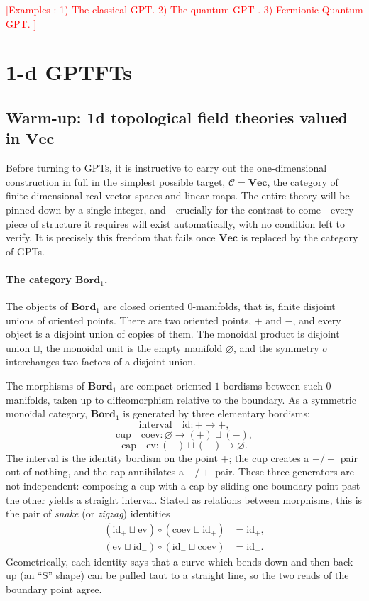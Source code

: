 \documentclass[prl,aps,10pt,superscriptaddress, floatfix]{revtex4-2}
\begin{document}
\textcolor{red}{[Examples : 1) The classical GPT. 2) The quantum GPT . 3) Fermionic Quantum GPT.  ]}

\section{1-d GPTFTs}

\subsection{Warm-up: 1d topological field theories valued in \texorpdfstring{$\mathbf{Vec}$}{Vec}}

Before turning to GPTs, it is instructive to carry out the one-dimensional construction in full in the simplest possible target, $\mathcal C=\mathbf{Vec}$, the category of finite-dimensional real vector spaces and linear maps. The entire theory will be pinned down by a single integer, and---crucially for the contrast to come---every piece of structure it requires will exist automatically, with no condition left to verify. It is precisely this freedom that fails once $\mathbf{Vec}$ is replaced by the category of GPTs.

\paragraph{The category $\mathbf{Bord}_1$.}
The objects of $\mathbf{Bord}_1$ are closed oriented $0$-manifolds, that is, finite disjoint unions of oriented points. There are two oriented points, $+$ and $-$, and every object is a disjoint union of copies of them. The monoidal product is disjoint union $\sqcup$, the monoidal unit is the empty manifold $\varnothing$, and the symmetry $\sigma$ interchanges two factors of a disjoint union.

The morphisms of $\mathbf{Bord}_1$ are compact oriented $1$-bordisms between such $0$-manifolds, taken up to diffeomorphism relative to the boundary. As a symmetric monoidal category, $\mathbf{Bord}_1$ is generated by three elementary bordisms:
\[
\text{interval}\quad \mathrm{id}:+\to+,
\]
\[
\text{cup}\quad \mathrm{coev}:\varnothing\to(+)\sqcup(-),
\]
\[
\text{cap}\quad \mathrm{ev}:(-)\sqcup(+)\to\varnothing.
\]
The interval is the identity bordism on the point $+$; the cup creates a $+/-$ pair out of nothing, and the cap annihilates a $-/+$ pair. These three generators are not independent: composing a cup with a cap by sliding one boundary point past the other yields a straight interval. Stated as relations between morphisms, this is the pair of \emph{snake} (or \emph{zigzag}) identities
\begin{align}
(\mathrm{id}_+\sqcup\mathrm{ev})\circ(\mathrm{coev}\sqcup\mathrm{id}_+)&=\mathrm{id}_+, \label{eq:snake1}\\
(\mathrm{ev}\sqcup\mathrm{id}_-)\circ(\mathrm{id}_-\sqcup\mathrm{coev})&=\mathrm{id}_-. \label{eq:snake2}
\end{align}
Geometrically, each identity says that a curve which bends down and then back up (an ``S'' shape) can be pulled taut to a straight line, so the two reads of the boundary point agree.
\end{document}
